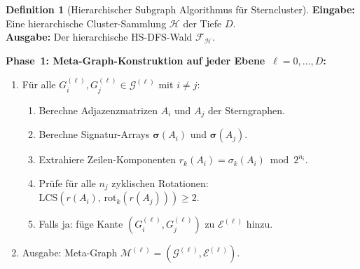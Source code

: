﻿\documentclass[a4paper,12pt]{report}
\theoremstyle{definition}
\newtheorem{definition}{Definition}
\begin{document}
\begin{definition}[Hierarchischer Subgraph Algorithmus für Sterncluster]
\label{def:hsdfs_stars}
\textbf{Eingabe:} Eine hierarchische Cluster-Sammlung $\mathcal{H}$ der Tiefe $D$.\\
\textbf{Ausgabe:} Der hierarchische HS-DFS-Wald $\mathcal{F}_\mathcal{H}$.

\smallskip
\textbf{Phase~1: Meta-Graph-Konstruktion auf jeder Ebene~$\ell = 0,\ldots,D$:}
\begin{enumerate}
    \item Für alle $G^{(\ell)}_i, G^{(\ell)}_j \in \mathcal{G}^{(\ell)}$ mit $i \neq j$:
    \begin{enumerate}
        \item Berechne Adjazenzmatrizen $A_i$ und $A_j$ der Sterngraphen.
        \item Berechne Signatur-Arrays $\boldsymbol{\sigma}(A_i)$ und $\boldsymbol{\sigma}(A_j)$.
        \item Extrahiere Zeilen-Komponenten $r_k(A_i) = \sigma_k(A_i) \bmod 2^{n_i}$.
        \item Prüfe für alle $n_j$ zyklischen Rotationen: $\mathrm{LCS}(r(A_i),\, \mathrm{rot}_k(r(A_j))) \geq 2$.
        \item Falls ja: füge Kante $(G^{(\ell)}_i, G^{(\ell)}_j)$ zu $\mathcal{E}^{(\ell)}$ hinzu.
    \end{enumerate}
    \item Ausgabe: Meta-Graph $\mathcal{M}^{(\ell)} = (\mathcal{G}^{(\ell)}, \mathcal{E}^{(\ell)})$.
\end{enumerate}


\end{definition}
\end{document}
